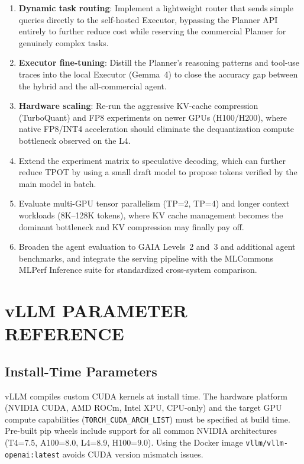 \documentclass[a4paper,12pt]{report}
\begin{document}
\begin{enumerate}
    \item \textbf{Dynamic task routing}: Implement a lightweight router that sends simple queries directly to the self-hosted Executor, bypassing the Planner API entirely to further reduce cost while reserving the commercial Planner for genuinely complex tasks.
    \item \textbf{Executor fine-tuning}: Distill the Planner's reasoning patterns and tool-use traces into the local Executor (Gemma~4) to close the accuracy gap between the hybrid and the all-commercial agent.
    \item \textbf{Hardware scaling}: Re-run the aggressive KV-cache compression (TurboQuant) and FP8 experiments on newer GPUs (H100/H200), where native FP8/INT4 acceleration should eliminate the dequantization compute bottleneck observed on the L4.
    \item Extend the experiment matrix to speculative decoding, which can further reduce TPOT by using a small draft model to propose tokens verified by the main model in batch.
    \item Evaluate multi-GPU tensor parallelism (TP=2, TP=4) and longer context workloads (8K--128K tokens), where KV cache management becomes the dominant bottleneck and KV compression may finally pay off.
    \item Broaden the agent evaluation to GAIA Levels~2 and~3 and additional agent benchmarks, and integrate the serving pipeline with the MLCommons MLPerf Inference suite for standardized cross-system comparison.
\end{enumerate}




\appendix

\chapter{vLLM PARAMETER REFERENCE}

\section{Install-Time Parameters}

vLLM compiles custom CUDA kernels at install time. The hardware platform (NVIDIA CUDA, AMD ROCm, Intel XPU, CPU-only) and the target GPU compute capabilities (\texttt{TORCH\_CUDA\_ARCH\_LIST}) must be specified at build time. Pre-built pip wheels include support for all common NVIDIA architectures (T4=7.5, A100=8.0, L4=8.9, H100=9.0). Using the Docker image \texttt{vllm/vllm-openai:latest} avoids CUDA version mismatch issues.
\end{document}
